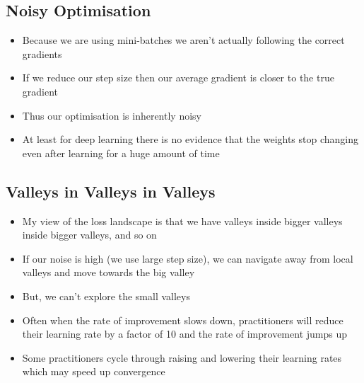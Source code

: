 
\begin{slide}
\section{Noisy Optimisation}

\begin{PauseHighLight}
  \begin{itemize}
  \item Because we are using mini-batches we aren't actually following
    the correct gradients\pause
  \item If we reduce our step size then our average gradient is closer
    to the true gradient\pause
  \item Thus our optimisation is inherently noisy\pause
  \item At least for deep learning there is no evidence that the
    weights stop changing even after learning for a huge amount of time\pause
  \end{itemize}
\end{PauseHighLight}

\end{slide}



\begin{slide}
\section{Valleys in Valleys in Valleys}

\begin{PauseHighLight}
  \begin{itemize}
  \item My view of the loss landscape is that we have valleys inside
    bigger valleys inside bigger valleys, and so on\pause
  \item If our noise is high (we use large step size), we can navigate
    away from local valleys and move towards the big valley\pause
  \item But, we can't explore the small valleys\pause
  \item Often when the rate of improvement slows down, practitioners
    will reduce their learning rate by a factor of 10 and the rate of
    improvement jumps up\pause
  \item Some practitioners cycle through raising and lowering their
    learning rates which may speed up convergence\pause
  \end{itemize}
\end{PauseHighLight}

\end{slide}

